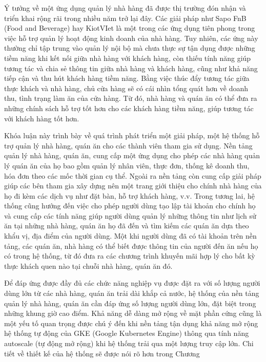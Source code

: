 Ý tưởng về một ứng dụng quản lý nhà hàng đã được thị trường đón nhận và triển khai rộng rãi trong nhiều năm trở lại đây.
Các giải pháp như Sapo FnB (Food and Beverage) hay KiotVIet là một trong các ứng dụng tiên phong trong việc hỗ trợ quản lý hoạt động kinh doanh của nhà hàng.
Tuy nhiên, các ứng này thường chỉ tập trung vào quản lý nội bộ mà chưa thực sự tận dụng được những tiềm năng khi kết nối giữa nhà hàng với khách hàng, còn thiếu tính năng giúp tương tác và chia sẻ thông tin giữa nhà hàng và khách hàng, cũng như khả năng tiếp cận và thu hút khách hàng tiềm năng.
Bằng việc thúc đẩy tương tác giữa thực khách và nhà hàng, chủ cửa hàng sẽ có cái nhìn tổng quát hơn về doanh thu, tình trạng làm ăn của cửa hàng.
Từ đó, nhà hàng và quán ăn có thể đưa ra những chính sách hỗ trợ tốt hơn cho các khách hàng tiềm năng, giúp tương tác với khách hàng tốt hơn.

Khóa luận này trình bày về quá trình phát triển một giải pháp, một hệ thống hỗ trợ quản lý nhà hàng, quán ăn cho các thành viên tham gia sử dụng.
Nền tảng quản lý nhà hàng, quán ăn, cung cấp một ứng dụng cho phép các nhà hàng quản lý quán ăn của họ bao gồm quản lý nhân viên, thực đơn, thống kê doanh thu, hóa đơn theo các mốc thời gian cụ thể.
Ngoài ra nền tảng còn cung cấp giải pháp giúp các bên tham gia xây dựng nên một trang giới thiệu cho chính nhà hàng của họ đi kèm các dịch vụ như đặt bàn, hỗ trợ khách hàng, v.v.
Trong tương lai, hệ thống cũng hướng đến việc cho phép người dùng tạo lập tài khoản cho chính họ và cung cấp các tính năng giúp người dùng quản lý những thông tin như lịch sử ăn tại những nhà hàng, quán ăn họ đã đến và tìm kiếm các quán ăn dựa theo khẩu vị, địa điểm của người dùng.
Một khi người dùng đã có tài khoản trên nền tảng, các quán ăn, nhà hàng có thể biết được thông tin của người đến ăn nếu họ có trong hệ thống, từ đó đưa ra các chương trình khuyến mãi hợp lý cho bất kỳ thực khách quen nào tại chuỗi nhà hàng, quán ăn đó.

Để đáp ứng được đầy đủ các chức năng nghiệp vụ được đặt ra với số lượng người dùng lớn từ các nhà hàng, quán ăn trải dài khắp cả nước, hệ thống của nền tảng quản lý nhà hàng, quán ăn cần đáp ứng số lượng người dùng lớn, đặt biệt trong những khung giờ cao điểm.
Khả năng dễ dàng mở rộng về mặt phần cứng  cũng là một yếu tố quan trọng được chú ý đến khi nền tảng tận dụng khả năng mở rộng hệ thống tự động của GKE (Google Kubernetes Engine) thông qua tính năng autoscale (tự động mở rộng) khi hệ thống trải qua một lượng truy cập lớn.
Chi tiết về thiết kế của hệ thống sẽ được nói rõ hơn trong Chương~

